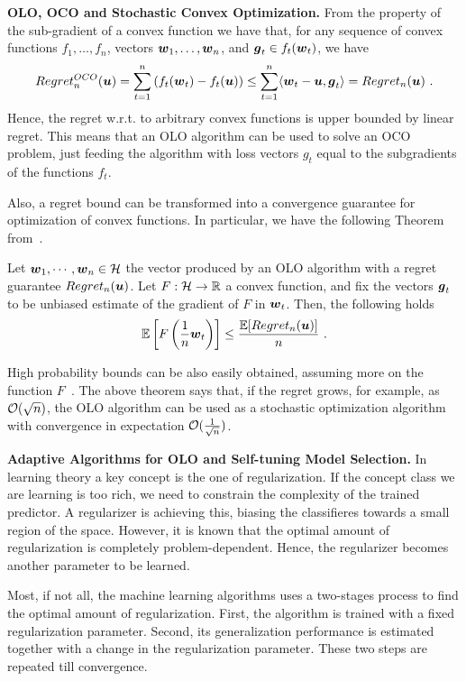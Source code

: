 \vspace{0.2cm}\noindent\textbf{\ac{OLO}, \ac{OCO} and Stochastic Convex Optimization.}
From the property of the sub-gradient of a convex function we have that, for any sequence of convex functions $f_1, \ldots, f_n$, vectors $\boldsymbol{w}_1,\ldots, \boldsymbol{w}_n$, and $\boldsymbol{g}_t \in f_t(\boldsymbol{w}_t)$, we have
\[
Regret^{OCO}_n(\boldsymbol{u}) = \sum_{t=1}^n \left( f_t(\boldsymbol{w}_t) -f_t(\boldsymbol{u})\right) \leq \sum_{t=1}^n \langle \boldsymbol{w}_t-\boldsymbol{u}, \boldsymbol{g}_t\rangle = Regret_n(\boldsymbol{u})~.
\]
Hence, the regret w.r.t. to arbitrary convex functions is upper bounded by linear regret. This means that an \ac{OLO} algorithm can be used to solve an \ac{OCO} problem, just feeding the algorithm with loss vectors $g_t$ equal to the subgradients of the functions $f_t$.

Also, a regret bound can be transformed into a convergence guarantee for optimization of convex functions.
In particular, we have the following Theorem from~\citet{Cesa-BianchiCG04}.
%
\begin{theorem}
\label{theo:online_to_batch}
Let $\boldsymbol{w}_1, \cdots, \boldsymbol{w}_n \in \mathcal{H}$ the vector produced by an OLO algorithm with a regret guarantee $Regret_n(\boldsymbol{u})$.
Let $F:\mathcal{H}\rightarrow\mathbb{R}$ a convex function, and fix the vectors $\boldsymbol{g}_t$ to be unbiased estimate of the gradient of $F$ in $\boldsymbol{w}_t$. Then, the following holds
\[
\mathbb{E}\left[F\left(\frac{1}{n} \boldsymbol{w}_t\right)\right] \leq \frac{\mathbb{E}[Regret_n(\boldsymbol{u})]}{n}~.
\]
\end{theorem}

High probability bounds can be also easily obtained, assuming more on the function $F$~\citep{Cesa-BianchiCG04}.
The above theorem says that, if the regret grows, for example, as $\mathcal{O}(\sqrt{n})$, the OLO algorithm can be used as a stochastic optimization algorithm with convergence in expectation $\mathcal{O}(\frac{1}{\sqrt{n}})$.


\vspace{0.2cm}\noindent\textbf{Adaptive Algorithms for OLO and Self-tuning Model Selection.}
In learning theory a key concept is the one of regularization. If the concept class we are learning is too rich, we need to constrain the complexity of the trained predictor. A regularizer is achieving this, biasing the classifieres towards a small region of the space. However, it is known that the optimal amount of regularization is completely problem-dependent. Hence, the regularizer becomes another parameter to be learned.

Most, if not all, the machine learning algorithms uses a two-stages process to find the optimal amount of regularization. First, the algorithm is trained with a fixed regularization parameter. Second, its generalization performance is estimated together with a change in the regularization parameter. These two steps are repeated till convergence.


